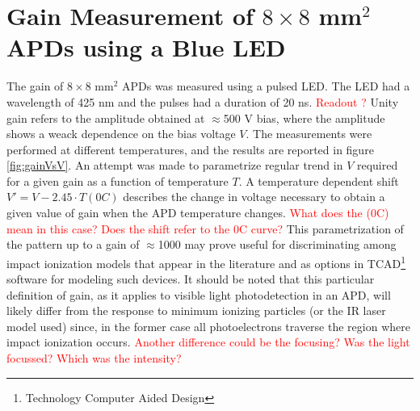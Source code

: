 \documentclass{article}
\begin{document}


\section{Gain Measurement of $8 \times 8$ mm$^2$ APDs using a Blue LED}
\label{sec:gain8x8led}

The gain of $8 \times 8$ mm$^2$ APDs was measured using a pulsed LED.
The LED had a wavelength of 425 nm and the pulses had a duration of 20 ns.
\textcolor{red}{Readout ?}
Unity gain refers to the amplitude obtained at $\approx$500 V bias, where the amplitude shows a weack dependence on the bias voltage $V$. 
The measurements were performed at different temperatures, and the results are reported in figure\,\ref{fig:gainVsV}.
An attempt was made to parametrize regular trend in $V$ required for a given gain as a function of temperature $T$.
A temperature dependent shift $V' = V -2.45 \cdot T( 0 C)$ describes the change in voltage necessary to obtain a given value of gain when the APD temperature changes.
\textcolor{red}{What does the (0C) mean in this case? Does the shift refer to the 0C curve?}
This parametrization of the pattern up to a gain of $\approx$1000 may prove useful for discriminating among impact ionization models that appear in the literature and as options in TCAD\footnote{Technology Computer Aided Design} software for modeling such devices.
It should be noted that this particular definition of gain, as it applies to visible light photodetection in an APD, will likely differ from the response to minimum ionizing particles (or the IR laser model used) since, in the former case all photoelectrons traverse the region where impact ionization occurs.
\textcolor{red}{Another difference could be the focusing? Was the light focussed? Which was the intensity?}
\end{document}
